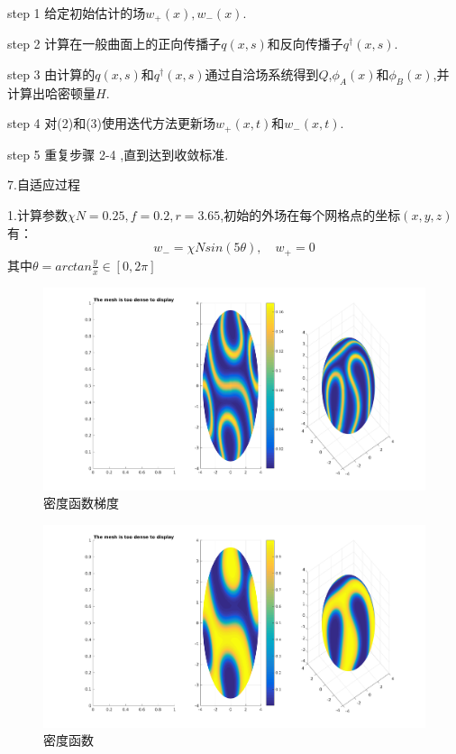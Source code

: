 \documentclass{article}
\begin{document}
step 1 给定初始估计的场$w_+(x), w_-(x)$.

step 2 计算在一般曲面上的正向传播子$q(x,s)$和反向传播子$q^{\dagger}(x,s)$.

step 3 由计算的$q(x,s)$和$q^{\dagger}(x,s)$通过自洽场系统得到$Q$,$\phi_A(x)$和$\phi_B(x)$,并计算出哈密顿量$H$.

step 4 对(2)和(3)使用迭代方法更新场$w_+(x,t)$和$w_-(x,t)$.

step 5 重复步骤 2-4 ,直到达到收敛标准.

7.自适应过程

1.计算参数$\chi N=0.25,f=0.2, r=3.65$,初始的外场在每个网格点的坐标$(x,y,z)$有：
\begin{equation*}
w_-=\chi Nsin(5\theta),\quad w_+=0
\end{equation*}
其中$\theta=arctan\frac{y}{x}\in[0,2\pi]$
\begin{figure}[H]
\centering
\includegraphics[scale=0.5]{./figures/Figure_50.png}
\caption{密度函数梯度}
\end{figure}
\begin{figure}[H]
\centering
\includegraphics[scale=0.5]{./figures/Figure_52.png}
\caption{密度函数}
\end{figure}
\end{document}
